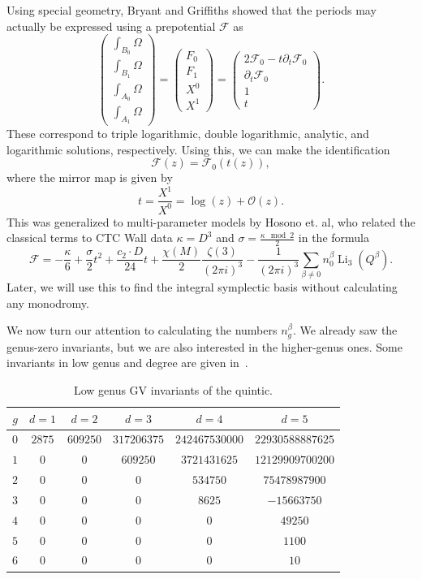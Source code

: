 \documentclass[10pt]{amsart}
\theoremstyle{definition}
\theoremstyle{remark}
\theoremstyle{plain}
\theoremstyle{definition}
\theoremstyle{remark}
\newcommand{\mc}[1]{\mathcal{#1}}
\newcommand{\on}[1]{\operatorname{#1}}
\newcommand{\1}{\mathbf{1}}
\newcommand{\2}{\mathbf{2}}
\newcommand{\3}{\mathbf{3}}
\begin{document}
Using special geometry, Bryant and Griffiths showed that the periods may actually be expressed using a prepotential $\mc{F}$ as
\[ \begin{pmatrix}
    \int_{B_0} \Omega \\
    \int_{B_1} \Omega \\
    \int_{A_0} \Omega \\
    \int_{A_1} \Omega
\end{pmatrix} = \begin{pmatrix}
    F_0 \\
    F_1 \\
    X^0 \\
    X^1 
\end{pmatrix} = \begin{pmatrix}
    2 \mc{F}_0 - t \partial_t \mc{F}_0 \\
    \partial_t \mc{F}_0 \\
    1 \\ 
    t
\end{pmatrix}.
\]
These correspond to triple logarithmic, double logarithmic, analytic, and logarithmic solutions, respectively. Using this, we can make the identification
\[ \mc{F}(z) = \mc{F}_0(t(z)), \]
where the mirror map is given by
\[ t = \frac{X^1}{X^0} = \log(z) + \mc{O}(z). \]
This was generalized to multi-parameter models by Hosono et. al, who related the classical terms to CTC Wall data $\kappa = D^3$ and $\sigma = \frac{\kappa \mod{2}}{2}$ in the formula
\[ \mc{F} = - \frac{\kappa}{6} + \frac{\sigma}{2}t^2 + \frac{c_2 \cdot D}{24}t + \frac{\chi(M)}{2} \frac{\zeta(3)}{(2\pi i)^3} - \frac{1}{(2\pi i)^3}\sum_{\beta \neq 0} n_0^{\beta} \on{Li}_3(Q^{\beta}). \]
Later, we will use this to find the integral symplectic basis without calculating any monodromy.

We now turn our attention to calculating the numbers $n_g^{\beta}$. We already saw the genus-zero invariants, but we are also interested in the higher-genus ones. Some invariants in low genus and degree are given in~.
\begin{table}[htpb]
    \centering
    \caption{Low genus GV invariants of the quintic.}
    \label{tab:g0gvquintic}
    \begin{tabular}{cccccc}
        \toprule
        $g$ & $d=1$ & $d=2$ & $d=3$ & $d=4$ & $d=5$ \\
        \midrule
        $0$ & $2875$ & $609250$ & $317206375$ & $242467530000$ & $22930588887625$ \\
        $1$ & $0$ & $0$ & $609250$ & $3721431625$ & $12129909700200$ \\
        $2$ & $0$ & $0$ & $0$ & $534750$ & $75478987900$ \\
        $3$ & $0$ & $0$ & $0$ & $8625$ & $-15663750$ \\
        $4$ & $0$ & $0$ & $0$ & $0$ & $49250$ \\
        $5$ & $0$ & $0$ & $0$ & $0$ & $1100$ \\
        $6$ & $0$ & $0$ & $0$ & $0$ & $10$ \\
        \bottomrule
    \end{tabular}
\end{table}
\end{document}
